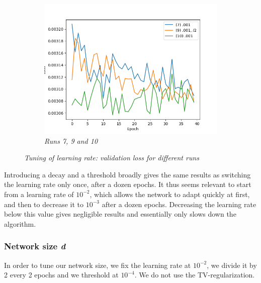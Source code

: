 \documentclass{article}
\begin{document}
\begin{figure}[!ht]
                \begin{subfigure}{.33\linewidth}
                    \centering
                    \includegraphics[width=\linewidth]{pics/hpp-lr-loss-7910.png}
                    \caption{\textit{Runs 7, 9 and 10}}
                    \label{fig:hpp-lr-div}
                \end{subfigure}
                \caption{\textit{Tuning of learning rate: validation loss for different runs}}
            \end{figure}
            \par
            Introducing a decay and a threshold broadly gives the same results as switching the learning rate only once, after a dozen epochs. It thus seems relevant to start from a learning rate of $10^{-2}$, which allows the network to adapt quickly at first, and then to decrease it to $10^{-3}$ after a dozen epochs. Decreasing the learning rate below this value gives negligible results and essentially only slows down the algorithm.

        \subsubsection{Network size \textit{d}}
            \label{par:hpp-d}
            In order to tune our network size, we fix the learning rate at $10^{-2}$, we divide it by 2 every 2 epochs and we threshold at $10^{-4}$. We do not use the TV-regularization.
\end{document}
